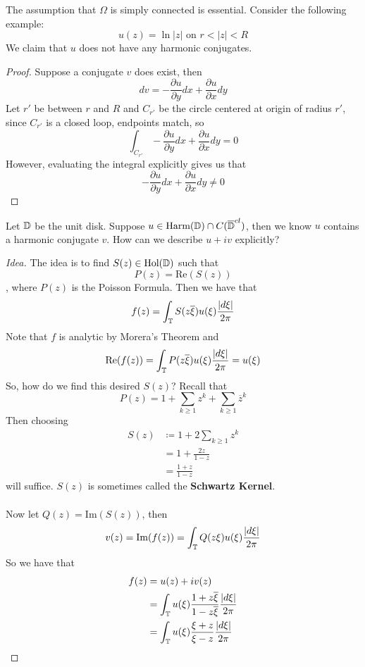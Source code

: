 \begin{remark}
    The assumption that $\Omega$ is simply connected is essential. Consider the following example:
    \[u(z) = \ln |z| \text{ on } r < |z| < R\]
    We claim that $u$ does not have any harmonic conjugates.
\end{remark}

\begin{proof}
Suppose a conjugate $v$ does exist, then
\[dv = - \frac{\partial u}{\partial y} dx + \frac{\partial u}{\partial x} dy\]
Let $r'$ be between $r$ and $R$ and $C_{r'}$ be the circle centered at origin of radius $r'$, since $C_{r'}$ is a closed loop, endpoints match, so
\[\int_{C_{r'}} - \frac{\partial u}{\partial y} dx + \frac{\partial u}{\partial x} dy = 0\]
However, evaluating the integral explicitly gives us that 
\[- \frac{\partial u}{\partial y} dx + \frac{\partial u}{\partial x} dy \neq 0\]
\end{proof}

\begin{question}
    Let $\mathbb{D}$ be the unit disk. Suppose $u \in \text{Harm}(\mathbb{D}) \cap C(\overline{\mathbb{D}}^{cl})$, then we know $u$ contains a harmonic conjugate $v$. How can we describe $u + iv$ explicitly?
\end{question}

\begin{proof}[Idea]
The idea is to find $S(z) \in \text{Hol}(\mathbb{D})$ such that
\[P(z) = \text{Re}(S(z))\]
, where $P(z)$ is the Poisson Formula. Then we have that
\[f(z) = \int_{\mathbb{T}} S(z \overline{\xi}) u(\xi) \frac{|d\xi|}{2\pi}\]
Note that $f$ is analytic by Morera's Theorem and
\[\text{Re}(f(z)) = \int_{\mathbb{T}} P(z \overline{\xi}) u(\xi) \frac{|d\xi|}{2\pi} = u(\xi)\]
So, how do we find this desired $S(z)$? Recall that
\[P(z) = 1 + \sum_{k \geq 1} z^k + \sum_{k \geq 1} \overline{z}^k\]
Then choosing
\begin{align*}
    S(z) &\coloneqq 1 + 2 \sum_{k \geq 1} z^k\\
    &= 1 + \frac{2z}{1 - z} \tag*{Domain of $S(z)$ is $\Dbb$}\\
    &= \frac{1 + z}{1 - z}
\end{align*}
will suffice. $S(z)$ is sometimes called the \textbf{Schwartz Kernel}.\\\\
Now let $Q(z) = \text{Im}(S(z))$, then
\[v(z) = \text{Im}(f(z)) = \int_{\mathbb{T}} Q(z \xi) u(\xi) \frac{|d\xi|}{2\pi}\]
So we have that
\begin{align*}
    f(z) &= u(z) + i v(z)\\
    &= \int_{\mathbb{T}} u(\xi) \frac{1 + z \overline{\xi}}{1 - z \overline{\xi}} \frac{|d\xi|}{2\pi}\\
    &= \int_{\mathbb{T}} u(\xi) \frac{\xi + z}{\xi - z} \frac{|d\xi|}{2\pi}
\end{align*}
\end{proof}


